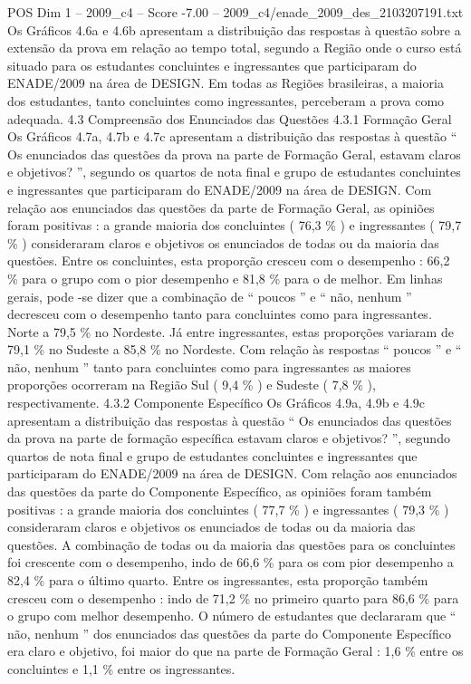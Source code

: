 \begin{textsample}{POS Dim 1 – 2009\_c4 – Score -7.00 – 2009\_c4/enade\_2009\_des\_2103207191.txt}
Os Gráficos 4.6a e 4.6b apresentam a distribuição das respostas à questão sobre a extensão da prova em relação ao tempo total, segundo a Região onde o curso está situado para os estudantes concluintes e ingressantes que participaram do ENADE/2009 na área de DESIGN.
Em todas as Regiões brasileiras, a maioria dos estudantes, tanto concluintes como ingressantes, perceberam a prova como adequada. 4.3 Compreensão dos Enunciados das Questões 4.3.1 Formação Geral Os Gráficos 4.7a, 4.7b e 4.7c apresentam a distribuição das respostas à questão “ Os enunciados das questões da prova na parte de Formação Geral, estavam claros e objetivos? ”, segundo os quartos de nota final e grupo de estudantes concluintes e ingressantes que participaram do ENADE/2009 na área de DESIGN.
Com relação aos enunciados das questões da parte de Formação Geral, as opiniões foram positivas : a grande maioria dos concluintes ( 76,3 \% ) e ingressantes ( 79,7 \% ) consideraram claros e objetivos os enunciados de todas ou da maioria das questões.
Entre os concluintes, esta proporção cresceu com o desempenho : 66,2 \% para o grupo com o pior desempenho e 81,8 \% para o de melhor.
Em linhas gerais, pode -se dizer que a combinação de “ poucos ” e “ não, nenhum ” decresceu com o desempenho tanto para concluintes como para ingressantes.
Norte a 79,5 \% no Nordeste.
Já entre ingressantes, estas proporções variaram de 79,1 \% no Sudeste a 85,8 \% no Nordeste.
Com relação às respostas “ poucos ” e “ não, nenhum ” tanto para concluintes como para ingressantes as maiores proporções ocorreram na Região Sul ( 9,4 \% ) e Sudeste ( 7,8 \% ), respectivamente. 4.3.2 Componente Específico Os Gráficos 4.9a, 4.9b e 4.9c apresentam a distribuição das respostas à questão “ Os enunciados das questões da prova na parte de formação específica estavam claros e objetivos? ”, segundo quartos de nota final e grupo de estudantes concluintes e ingressantes que participaram do ENADE/2009 na área de DESIGN.
Com relação aos enunciados das questões da parte do Componente Específico, as opiniões foram também positivas : a grande maioria dos concluintes ( 77,7 \% ) e ingressantes ( 79,3 \% ) consideraram claros e objetivos os enunciados de todas ou da maioria das questões.
A combinação de todas ou da maioria das questões para os concluintes foi crescente com o desempenho, indo de 66,6 \% para os com pior desempenho a 82,4 \% para o último quarto.
Entre os ingressantes, esta proporção também cresceu com o desempenho : indo de 71,2 \% no primeiro quarto para 86,6 \% para o grupo com melhor desempenho.
O número de estudantes que declararam que “ não, nenhum ” dos enunciados das questões da parte do Componente Específico era claro e objetivo, foi maior do que na parte de Formação Geral : 1,6 \% entre os concluintes e 1,1 \% entre os ingressantes.

\end{textsample}
